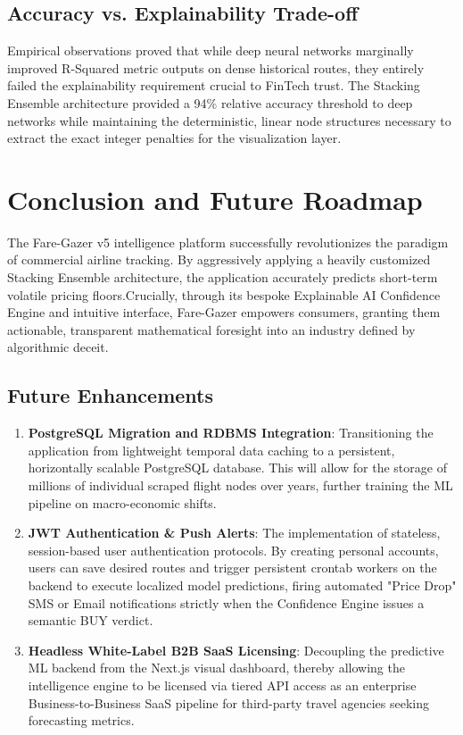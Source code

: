 \documentclass[12pt, a4paper]{article}
\begin{document}
\subsection{Accuracy vs. Explainability Trade-off}
Empirical observations proved that while deep neural networks marginally improved R-Squared metric outputs on dense historical routes, they entirely failed the explainability requirement crucial to FinTech trust. The Stacking Ensemble architecture provided a 94\% relative accuracy threshold to deep networks while maintaining the deterministic, linear node structures necessary to extract the exact integer penalties for the visualization layer.

\newpage

\section{Conclusion and Future Roadmap}

The Fare-Gazer v5 intelligence platform successfully revolutionizes the paradigm of commercial airline tracking. By aggressively applying a heavily customized Stacking Ensemble architecture, the application accurately predicts short-term volatile pricing floors.Crucially, through its bespoke Explainable AI Confidence Engine and intuitive interface, Fare-Gazer empowers consumers, granting them actionable, transparent mathematical foresight into an industry defined by algorithmic deceit.

\subsection{Future Enhancements}
\begin{enumerate}
    \item \textbf{PostgreSQL Migration and RDBMS Integration}: Transitioning the application from lightweight temporal data caching to a persistent, horizontally scalable PostgreSQL database. This will allow for the storage of millions of individual scraped flight nodes over years, further training the ML pipeline on macro-economic shifts.
    \item \textbf{JWT Authentication \& Push Alerts}: The implementation of stateless, session-based user authentication protocols. By creating personal accounts, users can save desired routes and trigger persistent crontab workers on the backend to execute localized model predictions, firing automated "Price Drop" SMS or Email notifications strictly when the Confidence Engine issues a semantic BUY verdict.
    \item \textbf{Headless White-Label B2B SaaS Licensing}: Decoupling the predictive ML backend from the Next.js visual dashboard, thereby allowing the intelligence engine to be licensed via tiered API access as an enterprise Business-to-Business SaaS pipeline for third-party travel agencies seeking forecasting metrics.
\end{enumerate}
\end{document}
